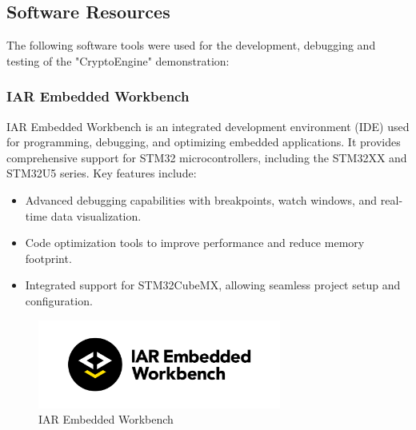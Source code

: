 \subsection{Software Resources}
The following software tools were used for the  development, debugging and testing of the "CryptoEngine" demonstration:

\subsubsection{IAR Embedded Workbench}
IAR Embedded Workbench is an integrated development environment (IDE) used for programming, debugging, and optimizing embedded applications. It provides comprehensive support for STM32 microcontrollers, including the STM32XX and STM32U5 series. Key features include:
\begin{itemize}
    \item Advanced debugging capabilities with breakpoints, watch windows, and real-time data visualization.
    \item Code optimization tools to improve performance and reduce memory footprint.
    \item Integrated support for STM32CubeMX, allowing seamless project setup and configuration.
\end{itemize}
\begin{figure}[H]
  \centering
  \includegraphics[width=8cm]{img/IAR.png}
  \caption{IAR Embedded Workbench}
  \label{fig:IAR}
\end{figure}

